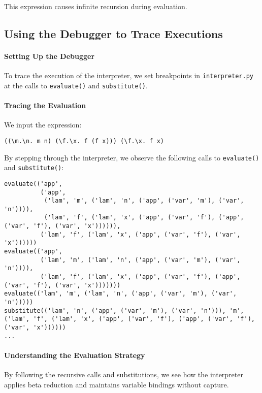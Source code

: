 This expression causes infinite recursion during evaluation.

\subsection{Using the Debugger to Trace Executions}

\paragraph{Setting Up the Debugger}

To trace the execution of the interpreter, we set breakpoints in \texttt{interpreter.py} at the calls to \texttt{evaluate()} and \texttt{substitute()}.

\paragraph{Tracing the Evaluation}

We input the expression:

\begin{verbatim}
((\m.\n. m n) (\f.\x. f (f x))) (\f.\x. f x)
\end{verbatim}

By stepping through the interpreter, we observe the following calls to \texttt{evaluate()} and \texttt{substitute()}:

\begin{verbatim}
evaluate(('app',
          ('app',
           ('lam', 'm', ('lam', 'n', ('app', ('var', 'm'), ('var', 'n')))),
           ('lam', 'f', ('lam', 'x', ('app', ('var', 'f'), ('app', ('var', 'f'), ('var', 'x')))))),
          ('lam', 'f', ('lam', 'x', ('app', ('var', 'f'), ('var', 'x'))))))
evaluate(('app',
          ('lam', 'm', ('lam', 'n', ('app', ('var', 'm'), ('var', 'n')))),
          ('lam', 'f', ('lam', 'x', ('app', ('var', 'f'), ('app', ('var', 'f'), ('var', 'x')))))))
evaluate(('lam', 'm', ('lam', 'n', ('app', ('var', 'm'), ('var', 'n')))))
substitute(('lam', 'n', ('app', ('var', 'm'), ('var', 'n'))), 'm', ('lam', 'f', ('lam', 'x', ('app', ('var', 'f'), ('app', ('var', 'f'), ('var', 'x'))))))
...
\end{verbatim}

\paragraph{Understanding the Evaluation Strategy}

By following the recursive calls and substitutions, we see how the interpreter applies beta reduction and maintains variable bindings without capture.

